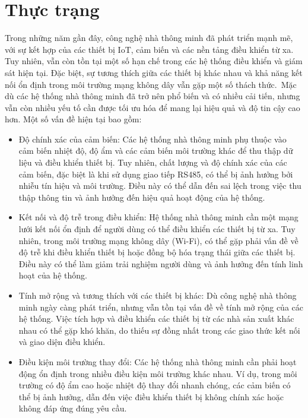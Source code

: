 \section{Thực trạng}
\tab Trong những năm gần đây, công nghệ nhà thông minh đã phát triển mạnh mẽ, với sự kết hợp của các thiết bị IoT, cảm biến và các nền tảng điều khiển từ xa. Tuy nhiên, vẫn còn tồn tại một số hạn chế trong các hệ thống điều khiển và giám sát hiện tại. Đặc biệt, sự tương thích giữa các thiết bị khác nhau và khả năng kết nối ổn định trong môi trường mạng không dây vẫn gặp một số thách thức.\
Mặc dù các hệ thống nhà thông minh đã trở nên phổ biến và có nhiều cải tiến, nhưng vẫn còn nhiều yếu tố cần được tối ưu hóa để mang lại hiệu quả và độ tin cậy cao hơn. Một số vấn đề hiện tại bao gồm:

\begin{itemize} [label = --] 
\item Độ chính xác của cảm biến: Các hệ thống nhà thông minh phụ thuộc vào cảm biến nhiệt độ, độ ẩm và các cảm biến môi trường khác để thu thập dữ liệu và điều khiển thiết bị. Tuy nhiên, chất lượng và độ chính xác của các cảm biến, đặc biệt là khi sử dụng giao tiếp RS485, có thể bị ảnh hưởng bởi nhiễu tín hiệu và môi trường. Điều này có thể dẫn đến sai lệch trong việc thu thập thông tin và ảnh hưởng đến hiệu quả hoạt động của hệ thống. 
\item Kết nối và độ trễ trong điều khiển: Hệ thống nhà thông minh cần một mạng lưới kết nối ổn định để người dùng có thể điều khiển các thiết bị từ xa. Tuy nhiên, trong môi trường mạng không dây (Wi-Fi), có thể gặp phải vấn đề về độ trễ khi điều khiển thiết bị hoặc đồng bộ hóa trạng thái giữa các thiết bị. Điều này có thể làm giảm trải nghiệm người dùng và ảnh hưởng đến tính linh hoạt của hệ thống. 
\item Tính mở rộng và tương thích với các thiết bị khác: Dù công nghệ nhà thông minh ngày càng phát triển, nhưng vẫn tồn tại vấn đề về tính mở rộng của các hệ thống. Việc tích hợp và điều khiển các thiết bị từ các nhà sản xuất khác nhau có thể gặp khó khăn, do thiếu sự đồng nhất trong các giao thức kết nối và giao diện điều khiển. 
\item Điều kiện môi trường thay đổi: Các hệ thống nhà thông minh cần phải hoạt động ổn định trong nhiều điều kiện môi trường khác nhau. Ví dụ, trong môi trường có độ ẩm cao hoặc nhiệt độ thay đổi nhanh chóng, các cảm biến có thể bị ảnh hưởng, dẫn đến việc điều khiển thiết bị không chính xác hoặc không đáp ứng đúng yêu cầu. 
\end{itemize}


